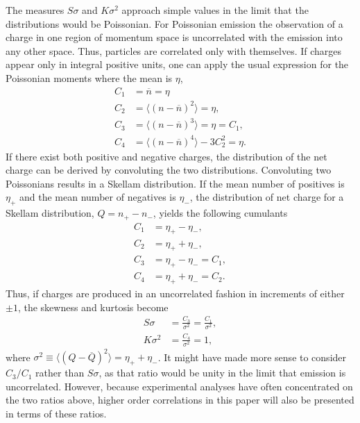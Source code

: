 \documentclass[aps,prc,nofootinbib,showpacs,superscriptaddress,groupedaddress]{revtex4-1}
\begin{document}
The measures $S\sigma$ and $K\sigma^2$ approach simple values in the limit that the distributions would be Poissonian. For Poissonian emission the observation of a charge in one region of momentum space is uncorrelated with the emission into any other space. Thus, particles are correlated only with themselves. If charges appear only in integral positive units, one can apply the usual expression for the Poissonian moments where the mean is $\eta$, 
\begin{eqnarray}
C_1&=\overline{n}=\eta\\
C_2&=\langle(n-\overline{n})^2\rangle=\eta,\\
C_3&=\langle(n-\overline{n})^3\rangle=\eta=C_1,\\
C_4&=\langle(n-\overline{n})^4\rangle-3C_2^2=\eta.
\end{eqnarray}
If there exist both positive and negative charges, the distribution of the net charge can be derived by convoluting the two distributions. Convoluting two Poissonians results in a Skellam distribution. If the mean number of positives is $\eta_+$ and the mean number of negatives is $\eta_-$, the distribution of net charge for a Skellam distribution, $Q=n_+-n_-$, yields the following cumulants
\begin{eqnarray}
C_1&=\eta_+-\eta_-,\\
C_2&=\eta_++\eta_-,\\
C_3&=\eta_+-\eta_-=C_1,\\
C_4&=\eta_++\eta_-=C_2.
\end{eqnarray}
Thus, if charges are produced in an uncorrelated fashion in increments of either $\pm 1$, the skewness and kurtosis become
\begin{eqnarray}
S\sigma&=\frac{C_3}{\sigma^2}=\frac{C_1}{\sigma^2},\\
K\sigma^2&=\frac{C_4}{\sigma^2}=1,
\end{eqnarray}
where $\sigma^2\equiv\langle(Q-\overline{Q})^2\rangle=\eta_++\eta_-$. It might have made more sense to consider $C_3/C_1$ rather than $S\sigma$, as that ratio would be unity in the limit that emission is uncorrelated. However, because experimental analyses have often concentrated on the two ratios above, higher order correlations in this paper will also be presented in terms of these ratios.
\end{document}
